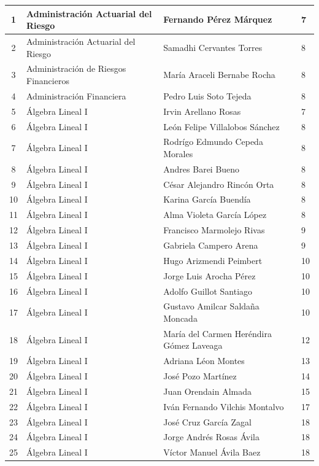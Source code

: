 {\begin{longtable}{|c|p{6.5cm}|p{5cm}|p{1.5cm}|}
1 & Administración Actuarial del Riesgo & Fernando Pérez Márquez & 7 \\ \hline
2 & Administración Actuarial del Riesgo & Samadhi Cervantes Torres & 8 \\ \hline
3 & Administración de Riesgos Financieros & María Araceli Bernabe Rocha & 8 \\ \hline
4 & Administración Financiera & Pedro Luis Soto Tejeda & 8 \\ \hline
5 & Álgebra Lineal I & Irvin Arellano Rosas & 7 \\ \hline
6 & Álgebra Lineal I & León Felipe Villalobos Sánchez & 8 \\ \hline
7 & Álgebra Lineal I & Rodrígo Edmundo Cepeda Morales & 8 \\ \hline
8 & Álgebra Lineal I & Andres Barei Bueno & 8 \\ \hline
9 & Álgebra Lineal I & César Alejandro Rincón Orta & 8 \\ \hline
10 & Álgebra Lineal I & Karina García Buendía & 8 \\ \hline
11 & Álgebra Lineal I & Alma Violeta García López & 8 \\ \hline
12 & Álgebra Lineal I & Francisco Marmolejo Rivas & 9 \\ \hline
13 & Álgebra Lineal I & Gabriela Campero Arena & 9 \\ \hline
14 & Álgebra Lineal I & Hugo Arizmendi Peimbert & 10 \\ \hline
15 & Álgebra Lineal I & Jorge Luis Arocha Pérez & 10 \\ \hline
16 & Álgebra Lineal I & Adolfo Guillot Santiago & 10 \\ \hline
17 & Álgebra Lineal I & Gustavo Amilcar Saldaña Moncada & 10 \\ \hline
18 & Álgebra Lineal I & María del Carmen Heréndira Gómez Laveaga & 12 \\ \hline
19 & Álgebra Lineal I & Adriana Léon Montes & 13 \\ \hline
20 & Álgebra Lineal I & José Pozo Martínez & 14 \\ \hline
21 & Álgebra Lineal I & Juan Orendain Almada & 15 \\ \hline
22 & Álgebra Lineal I & Iván Fernando Vilchis Montalvo & 17 \\ \hline
23 & Álgebra Lineal I & José Cruz García Zagal & 18 \\ \hline
24 & Álgebra Lineal I & Jorge Andrés Rosas Ávila & 18 \\ \hline
25 & Álgebra Lineal I & Víctor Manuel Ávila Baez & 18 \\ \hline

\end{longtable}}
